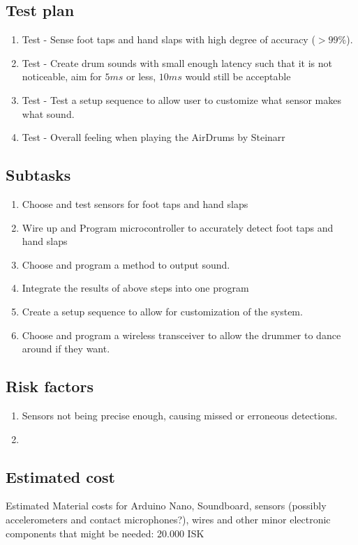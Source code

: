 \documentclass{article}
\begin{document}
\subsection{Test plan}
\begin{enumerate}
    \item Test - Sense foot taps and hand slaps with high degree of accuracy ($>99\%$).
    \item Test - Create drum sounds with small enough latency such that it is not noticeable, aim for $5 ms$ or less, $10 ms$ would still be acceptable
    \item  Test - Test a setup sequence to allow user to customize what sensor makes what sound.
    \item Test - Overall feeling when playing the AirDrums by Steinarr
\end{enumerate}

\subsection{Subtasks}
\begin{enumerate}
    \item Choose and test sensors for foot taps and hand slaps
    \item Wire up and Program microcontroller to accurately detect foot taps and hand slaps
    \item Choose and program a method to output sound.
    \item Integrate the results of above steps into one program
    \item Create a setup sequence to allow for customization of the system. 
    \item Choose and program a wireless transceiver to allow the drummer to dance around if they want.
\end{enumerate}

\subsection{Risk factors}
\begin{enumerate}
    \item Sensors not being precise enough, causing missed or erroneous detections.
    \item  
\end{enumerate}

\subsection{Estimated cost}
Estimated Material costs for Arduino Nano, Soundboard, sensors (possibly accelerometers and contact microphones?), wires and other minor electronic components that might be needed:  20.000 ISK
\end{document}
